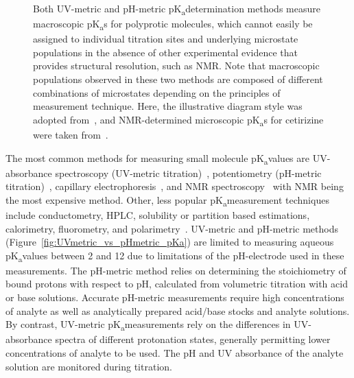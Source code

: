 \documentclass[9pt,lineno]{elife}
\newcommand{\pKa}{pK\textsubscript{a}}
\begin{document}
\begin{figure}
\begin{center}
{Both UV-metric and pH-metric \pKa determination methods measure macroscopic \pKa s for polyprotic molecules, which cannot easily be assigned to individual titration sites and underlying microstate populations in the absence of other experimental evidence that provides structural resolution, such as NMR. 
Note that macroscopic populations observed in these two methods are composed of different combinations of microstates depending on the principles of measurement technique.
Here, the illustrative diagram style was adopted from~\citep{rupp_predicting_2011}, and NMR-determined microscopic \pKa s for cetirizine were taken from~\citep{marosi_triprotic_2009}. 
}
\label{fig:micro_vs_macro_pKa}
\end{center}
\end{figure}

The most common methods for measuring small molecule \pKa values are UV-absorbance spectroscopy (UV-metric titration)~\citep{tam_multi-wavelength_2001, allen_multiwavelength_1998,comer_ionization_2014}, potentiometry (pH-metric titration)~\citep{avdeef_ph-metric_1999,comer_ionization_2014}, capillary electrophoresis~\citep{cabot_novel_2015, wan_rapid_2002}, and NMR spectroscopy~\citep{bezencon_pka_2014} with NMR being the most expensive method. Other, less popular \pKa measurement techniques include conductometry, HPLC, solubility or partition based estimations, calorimetry, fluorometry, and polarimetry~\citep{reijenga_development_2013}. 
UV-metric and pH-metric methods (Figure~\ref{fig:UVmetric_vs_pHmetric_pKa}) are limited to measuring aqueous \pKa values between 2 and 12 due to limitations of the pH-electrode used in these measurements.
The pH-metric method relies on determining the stoichiometry of bound protons with respect to pH, calculated from volumetric titration with acid or base solutions. Accurate pH-metric measurements require high concentrations of analyte as well as analytically prepared acid/base stocks and analyte solutions. 
By contrast, UV-metric \pKa measurements rely on the differences in UV-absorbance spectra of different protonation states, generally permitting lower concentrations of analyte to be used.
The pH and UV absorbance of the analyte solution are monitored during titration. 
\end{document}
